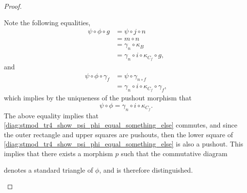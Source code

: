 \begin{proof}
\begin{enumerate}[label={(\bfseries TR\arabic*)}]
{            Note the following equalities,
            \begin{align*}
                \psi \circ \phi \circ g &= \psi \circ j \circ n \\
                &= m \circ n \\
                &= \gamma_n \circ \kappa_B \\
                &= \gamma_n \circ i \circ \kappa_{C_f} \circ g,
            \end{align*}
            and
            \begin{align*}
                \psi \circ \phi \circ \gamma_f &= \psi \circ \gamma_{n \circ f} \\
                &= \gamma_n \circ i \circ \kappa_{C_f} \circ \gamma_f,
            \end{align*}
            which implies by the uniqueness of the pushout morphism that
            \[
                \psi \circ \phi = \gamma_n \circ i \circ \kappa_{C_f}.
            \]
            The above equality implies that \autoref{diag:stmod_tr4_show_psi_phi_equal_something_else} commutes, and since the outer rectangle and upper squares are pushouts, then the lower square of \autoref{diag:stmod_tr4_show_psi_phi_equal_something_else} is also a pushout. This implies that there exists a morphism \( p \) such that the commutative diagram
            \begin{center}
            \end{center}
            denotes a standard triangle of \( \phi \), and is therefore distinguished.

}
\end{enumerate}
\end{proof}
